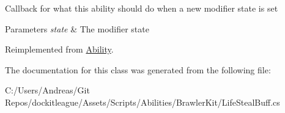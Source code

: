 Callback for what this ability should do when a new modifier state is set 


\begin{DoxyParams}{Parameters}
{\em state} & The modifier state\\
\hline
\end{DoxyParams}


Reimplemented from \hyperlink{class_ability_a18f5361c45dc334b541892880382c098}{Ability}.



The documentation for this class was generated from the following file\+:\begin{DoxyCompactItemize}
\item 
C\+:/\+Users/\+Andreas/\+Git Repos/dockitleague/\+Assets/\+Scripts/\+Abilities/\+Brawler\+Kit/Life\+Steal\+Buff.\+cs\end{DoxyCompactItemize}
